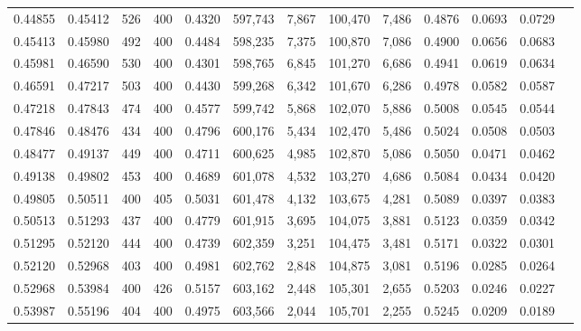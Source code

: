\begin{tabular}{rrrrrrrrrrrrr}
0.44855 & 0.45412 &    526 & 400 &                                     0.4320 & 597,743 &   7,867 & 100,470 &   7,486 & 0.4876 & 0.0693 & 0.0729 \\
0.45413 & 0.45980 &    492 & 400 &                                     0.4484 & 598,235 &   7,375 & 100,870 &   7,086 & 0.4900 & 0.0656 & 0.0683 \\
0.45981 & 0.46590 &    530 & 400 &                                     0.4301 & 598,765 &   6,845 & 101,270 &   6,686 & 0.4941 & 0.0619 & 0.0634 \\
0.46591 & 0.47217 &    503 & 400 &                                     0.4430 & 599,268 &   6,342 & 101,670 &   6,286 & 0.4978 & 0.0582 & 0.0587 \\
0.47218 & 0.47843 &    474 & 400 &                                     0.4577 & 599,742 &   5,868 & 102,070 &   5,886 & 0.5008 & 0.0545 & 0.0544 \\
0.47846 & 0.48476 &    434 & 400 &                                     0.4796 & 600,176 &   5,434 & 102,470 &   5,486 & 0.5024 & 0.0508 & 0.0503 \\
0.48477 & 0.49137 &    449 & 400 &                                     0.4711 & 600,625 &   4,985 & 102,870 &   5,086 & 0.5050 & 0.0471 & 0.0462 \\
0.49138 & 0.49802 &    453 & 400 &                                     0.4689 & 601,078 &   4,532 & 103,270 &   4,686 & 0.5084 & 0.0434 & 0.0420 \\
0.49805 & 0.50511 &    400 & 405 &                                     0.5031 & 601,478 &   4,132 & 103,675 &   4,281 & 0.5089 & 0.0397 & 0.0383 \\
0.50513 & 0.51293 &    437 & 400 &                                     0.4779 & 601,915 &   3,695 & 104,075 &   3,881 & 0.5123 & 0.0359 & 0.0342 \\
0.51295 & 0.52120 &    444 & 400 &                                     0.4739 & 602,359 &   3,251 & 104,475 &   3,481 & 0.5171 & 0.0322 & 0.0301 \\
0.52120 & 0.52968 &    403 & 400 &                                     0.4981 & 602,762 &   2,848 & 104,875 &   3,081 & 0.5196 & 0.0285 & 0.0264 \\
0.52968 & 0.53984 &    400 & 426 &                                     0.5157 & 603,162 &   2,448 & 105,301 &   2,655 & 0.5203 & 0.0246 & 0.0227 \\
0.53987 & 0.55196 &    404 & 400 &                                     0.4975 & 603,566 &   2,044 & 105,701 &   2,255 & 0.5245 & 0.0209 & 0.0189 \\

\end{tabular}

